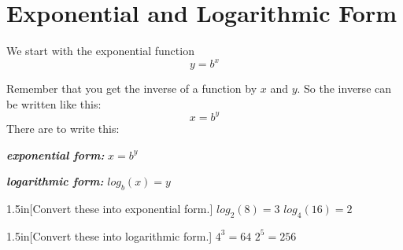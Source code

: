 \section{Exponential and Logarithmic Form}

We start with the exponential function 
{
    \large
    \[ y = b^x \]
}

Remember that you get the inverse of a function by  $x$ and $y$. 
So the inverse can be written like this:
{
    \large
    \[ x = b^y \]
}
There are  to write this:
\begin{tcbraster}[
    raster equal height,
    raster left skip=2in, raster right skip=2in,
    raster before skip=\onelineskip, raster after skip=\onelineskip,
    ]
    \begin{tcolorbox}
        {\bfseries\itshape exponential form:}
        \centering\large
        $x = b^y $
    \end{tcolorbox}
    \begin{tcolorbox}
        {\bfseries\itshape logarithmic form:}
        \centering\large
        $log_b(x) = y $
    \end{tcolorbox}
\end{tcbraster}

\begin{my2Problems}{1.5in}[Convert these into exponential form.]
    {
        $log_2(8) = 3$
    }
    {
        $log_{4}(16) = 2$
    }
\end{my2Problems}


\begin{my2Problems}{1.5in}[Convert these into logarithmic form.]
    {
        $4^3 = 64$
    }
    {
        $2^5 = 256$
    }
\end{my2Problems}